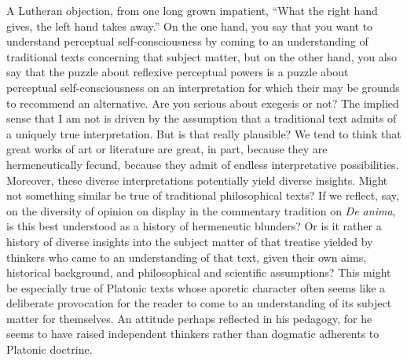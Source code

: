 A Lutheran objection, from one long grown impatient, ``What the right hand gives, the left hand takes away.'' On the one hand, you say that you want to understand perceptual self-consciousness by coming to an understanding of traditional texts concerning that subject matter, but on the other hand, you also say that the puzzle about reflexive perceptual powers is a puzzle about perceptual self-consciousness on an interpretation for which their may be grounds to recommend an alternative. Are you serious about exegesis or not? The implied sense that I am not is driven by the assumption that a traditional text admits of a uniquely true interpretation. But is that really plausible? We tend to think that great works of art or literature are great, in part, because they are hermeneutically fecund, because they admit of endless interpretative possibilities. Moreover, these diverse interpretations potentially yield diverse insights. Might not something similar be true of traditional philosophical texts? If we reflect, say, on the diversity of opinion on display in the commentary tradition on \emph{De anima}, is this best understood as a history of hermeneutic blunders? Or is it rather a history of diverse insights into the subject matter of that treatise yielded by thinkers who came to an understanding of that text, given their own aims, historical background, and philosophical and scientific assumptions? This might be especially true of Platonic texts whose aporetic character often seems like a deliberate provocation for the reader to come to an understanding of its subject matter for themselves. An attitude perhaps reflected in his pedagogy, for he seems to have raised independent thinkers rather than dogmatic adherents to Platonic doctrine.


